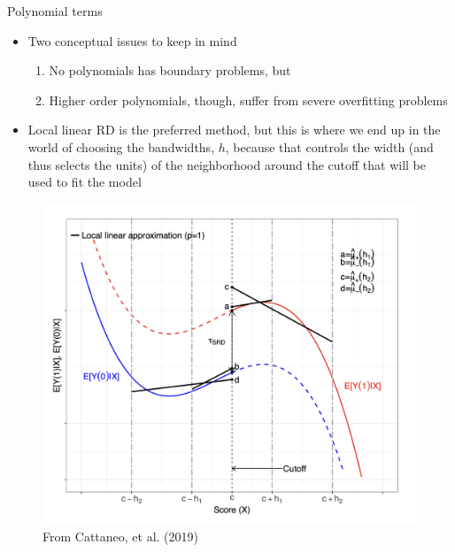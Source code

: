 \documentclass{beamer}
\begin{document}
\begin{frame}{Polynomial terms}

\begin{itemize}
\item Two conceptual issues to keep in mind
	\begin{enumerate}
	\item No polynomials has boundary problems, but
	\item Higher order polynomials, though, suffer from severe overfitting problems
	\end{enumerate}
\item Local linear RD is the preferred method, but this is where we end up in the world of choosing the bandwidths, $h$, because that controls the width (and thus selects the units) of the neighborhood around the cutoff that will be used to fit the model
\end{itemize}

\end{frame}


\begin{frame}

		\begin{figure}
		\includegraphics[scale=0.27]{./lecture_includes/cattaneo_bandwidth}
		\caption{From Cattaneo, et al. (2019)}
		\end{figure}

\end{frame}
\end{document}
